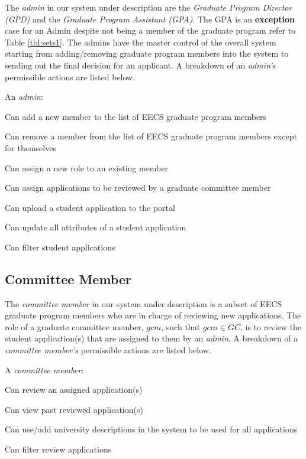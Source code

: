\documentclass[fontsize=12pt,paper=letter,twoside]{scrartcl}
\begin{document}
The \emph{admin} in our system under description are  the \emph{Graduate Program Director (GPD)} and the \emph{Graduate Program Assistant (GPA)}. The GPA is an \textbf{exception} case for an Admin despite not being a member of the graduate program refer to Table \ref{tbl:sets1}. The admins have the master control of the overall system starting from adding/removing graduate program members into the system to sending out the final decision for an applicant. A breakdown of an \emph{admin's} permissible actions are listed below.

\smallskip
\noindent An \emph{admin}:

\begin{mylist}
\item Can add a new member to the list of EECS graduate program members
\item Can remove a member from the list of EECS graduate program members except for themselves
\item Can assign a new role to an existing member
\item Can assign applications to be reviewed by a graduate committee member
\item Can upload a student application to the portal
\item Can update all attributes of a student application
\item Can filter student applications
\end{mylist}

\subsection{Committee Member}

The \emph{committee member} in our system under description is a subset of EECS graduate program members who are in charge of reviewing new applications. The role of a graduate committee member, $gcm$, such that $gcm \in GC$, is to review the student application(s) that are assigned to them by an \emph{admin}. A breakdown of a \emph{committee member's} permissible actions are listed below.

\smallskip
\noindent A \emph{committee member}:

\begin{mylist}
\item Can review an assigned application(s)
\item Can view past reviewed application(s)
\item Can use/add university descriptions in the system to be used for all applications
\item Can filter review applications
\end{mylist}
\end{document}
